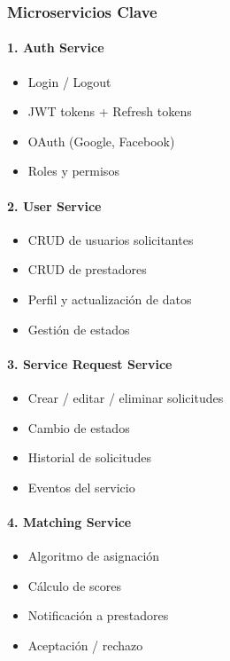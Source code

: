 \documentclass[12pt,a4paper,spanish]{article}
\begin{document}
\subsubsection{Microservicios Clave}

\paragraph{1. Auth Service}
\begin{itemize}
    \item Login / Logout
    \item JWT tokens + Refresh tokens
    \item OAuth (Google, Facebook)
    \item Roles y permisos
\end{itemize}

\paragraph{2. User Service}
\begin{itemize}
    \item CRUD de usuarios solicitantes
    \item CRUD de prestadores
    \item Perfil y actualización de datos
    \item Gestión de estados
\end{itemize}

\paragraph{3. Service Request Service}
\begin{itemize}
    \item Crear / editar / eliminar solicitudes
    \item Cambio de estados
    \item Historial de solicitudes
    \item Eventos del servicio
\end{itemize}

\paragraph{4. Matching Service}
\begin{itemize}
    \item Algoritmo de asignación
    \item Cálculo de scores
    \item Notificación a prestadores
    \item Aceptación / rechazo
\end{itemize}
\end{document}
